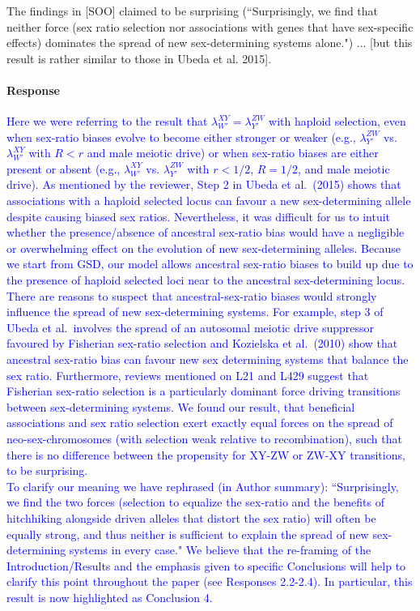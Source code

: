 \documentclass[10pt,letterpaper]{article}
\begin{document}
\noindent\subsubsection{}
The findings in [SOO] claimed to be surprising (``Surprisingly, we find that neither force (sex ratio selection nor associations with genes that have sex-specific effects) dominates the spread of new sex-determining systems alone.") ... [but this result is rather similar to those in Ubeda et al. 2015]. 

\noindent\paragraph{Response}
\textcolor{blue}{
Here we were referring to the result that $\lambda_{W'}^{XY} = \lambda_{Y'}^{ZW}$ with haploid selection, even when sex-ratio biases evolve to become either stronger or weaker (e.g., $\lambda_{Y'}^{ZW}$ vs. $\lambda_{W'}^{XY}$ with $R<r$ and male meiotic drive) or when sex-ratio biases are either present or absent (e.g., $\lambda_{W'}^{XY}$ vs. $\lambda_{Y'}^{ZW}$ with $r<1/2$, $R=1/2$, and male meiotic drive).  
As mentioned by the reviewer, Step 2 in Ubeda et al.\ (2015) shows that associations with a haploid selected locus can favour a new sex-determining allele despite causing biased sex ratios. 
Nevertheless, it was difficult for us to intuit whether the presence/absence of ancestral sex-ratio bias would have a negligible or overwhelming effect on the evolution of new sex-determining alleles. 
Because we start from GSD, our model allows ancestral sex-ratio biases to build up due to the presence of haploid selected loci near to the ancestral sex-determining locus. 
There are reasons to suspect that ancestral-sex-ratio biases would strongly influence the spread of new sex-determining systems.
For example, step 3 of Ubeda et al.\ involves the spread of an autosomal meiotic drive suppressor favoured by Fisherian sex-ratio selection and Kozielska et al.\ (2010) show that ancestral sex-ratio bias can favour new sex determining systems that balance the sex ratio.
Furthermore, reviews mentioned on L21 and L429 suggest that Fisherian sex-ratio selection is a particularly dominant force driving transitions between sex-determining systems.
We found our result, that beneficial associations and sex ratio selection exert exactly equal forces on the spread of neo-sex-chromosomes (with selection weak relative to recombination), such that there is no difference between the propensity for XY-ZW or ZW-XY transitions, to be surprising.
\\
\indent
To clarify our meaning we have rephrased (in Author summary): ``Surprisingly, we find the two forces (selection to equalize the sex-ratio and the benefits of hitchhiking alongside driven alleles that distort the sex ratio) will often be equally strong, and thus neither is sufficient to explain the spread of new sex-determining systems in every case." 
We believe that the re-framing of the Introduction/Results and the emphasis given to specific Conclusions will help to clarify this point throughout the paper (see Responses 2.2-2.4). 
In particular, this result is now highlighted as Conclusion 4.
}
\end{document}
